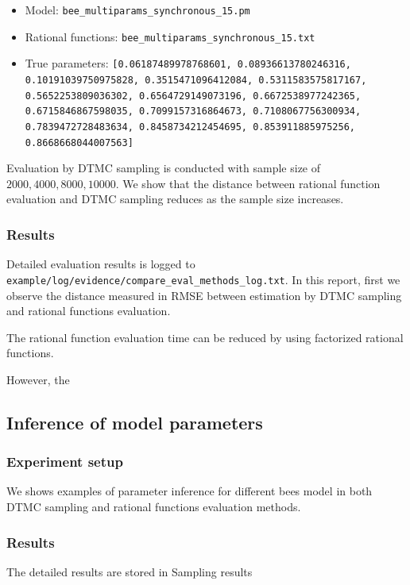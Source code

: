 \documentclass[12pt]{article}
\theoremstyle{definition}
\begin{document}
\begin{enumerate}
  \begin{itemize}
  \item Model: \texttt{bee\_multiparams\_synchronous\_15.pm}
  \item Rational functions: \texttt{bee\_multiparams\_synchronous\_15.txt}
  \item True parameters: \texttt{[0.06187489978768601, 0.08936613780246316,
      0.10191039750975828, 0.3515471096412084, 0.5311583575817167,
      0.5652253809036302, 0.6564729149073196, 0.6672538977242365,
      0.6715846867598035, 0.7099157316864673, 0.7108067756300934,
      0.7839472728483634, 0.8458734212454695, 0.853911885975256,
      0.8668668044007563]}
  \end{itemize}
\end{enumerate}
Evaluation by DTMC sampling is conducted with sample size of $2000, 4000, 8000,
10000$. We show that the distance between rational function evaluation and DTMC
sampling reduces as the sample size increases.

\subsubsection{Results}
Detailed evaluation results is logged to
\texttt{example/log/evidence/compare\_eval\_methods\_log.txt}. In this report,
first we observe the distance measured in RMSE between estimation by DTMC
sampling and rational functions evaluation.


The rational function evaluation time can be reduced by using factorized
rational functions.

However, the 



\subsection{Inference of model parameters}
\subsubsection{Experiment setup}
We shows examples of parameter inference for different bees model in both DTMC
sampling and rational functions evaluation methods.



\subsubsection{Results}
The detailed results are
stored in
Sampling results
\end{document}
